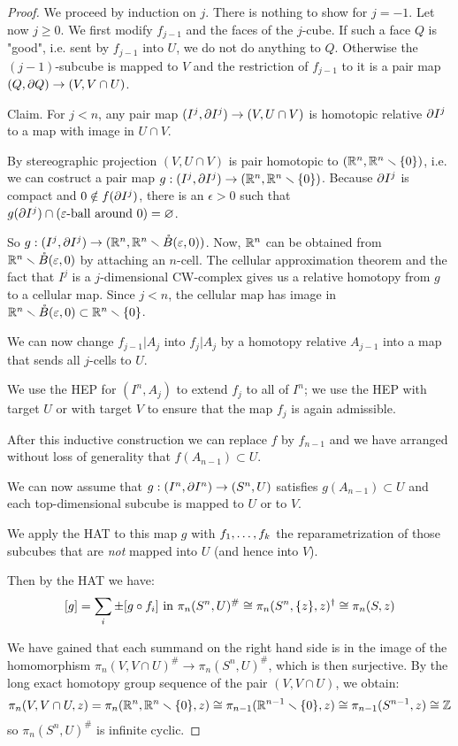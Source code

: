\begin{proof}
We proceed by induction on $j$. There is nothing to show for $j=-1$. Let now $j\geq 0$. We first modify $f_{j-1}$ and the faces of the $j$-cube. If such a face $Q$ is "good", i.e. sent by $f_{j-1}$ into $U$, we do not do anything to $Q$. Otherwise the $(j-1)$-subcube is mapped to $V$ and the restriction of $f_{j-1}$ to it is a pair map $(Q,\partial Q)\to (V,V\cap U)$.

Claim. For $j<n$, any pair map $(I^j,\partial I^j)\to (V,U\cap V)$ is homotopic relative $\partial I^j$ to a map with image in $U\cap V$.

\begin{claimproof}
By stereographic projection $(V,U\cap V)$ is pair homotopic to $({\mathbb R}^n,{\mathbb R}^n\smallsetminus\{0\})$, i.e. we can costruct a pair map $g:(I^j,\partial I^j)\to ({\mathbb R}^n,{\mathbb R}^n\smallsetminus\{0\})$. Because $\partial I^j$ is compact and $0\notin f(\partial I^j)$, there is an $\epsilon>0$ such that $g(\partial I^j)\cap(\varepsilon\text{-ball around }0)=\varnothing$.

So $g:(I^j,\partial I^j)\to({\mathbb R}^n,{\mathbb R}^n\smallsetminus\mathring B(\varepsilon,0))$. Now, ${\mathbb R}^n$ can be obtained from ${\mathbb R}^n\smallsetminus\mathring B(\varepsilon,0)$ by attaching an $n$-cell. The cellular approximation theorem and the fact that $I^j$ is a $j$-dimensional CW-complex gives us a relative homotopy from $g$ to a cellular map. Since $j<n$, the cellular map has image in ${\mathbb R}^n\smallsetminus\mathring B(\varepsilon,0)\subset{\mathbb R}^n\smallsetminus\{0\}$.
\end{claimproof}

We can now change $f_{j-1}|A_j$ into $f_j|A_j$ by a homotopy relative $A_{j-1}$ into a map that sends all $j$-cells to $U$.

We use the HEP for $(I^n,A_j)$ to extend $f_j$ to all of $I^n$; we use the HEP with target $U$ or with target $V$ to ensure that the map $f_j$ is again admissible.

After this inductive construction we can replace $f$ by $f_{n-1}$ and we have arranged without loss of generality that $f(A_{n-1})\subset U$.

We can now assume that $g:(I^n,\partial I^n)\to(S^n,U)$ satisfies $g(A_{n-1})\subset U$ and each top-dimensional subcube is mapped to $U$ or to $V$.

We apply the HAT to this map $g$ with ${{f}_1,\dots,{f}_{k}}$ the reparametrization of those subcubes that are \textit{not} mapped into $U$ (and hence into $V$).

Then by the HAT we have:
\[[g]=\sum_i\pm[g\circ f_i]\text{ in }\pi_n(S^n,U)^\#\cong\pi_n(S^n,\{z\},z)^\dagger\cong\pi_n(S,z)\]

We have gained that each summand on the right hand side is in the image of the homomorphism $\pi_n(V,V\cap U)^\#\to\pi_n(S^n,U)^\#$, which is then surjective. By the long exact homotopy group sequence of the pair $(V,V\cap U)$, we obtain:
\[\pi_n(V,V\cap U,z)=\pi_n({\mathbb R}^n,{\mathbb R}^n\smallsetminus\{0\},z)\cong\pi_{n-1}({\mathbb R}^{n-1}\smallsetminus\{0\},z)\cong\pi_{n-1}(S^{n-1},z)\cong{\mathbb Z}\]
so $\pi_n(S^n,U)^\#$ is infinite cyclic.
\end{proof}

